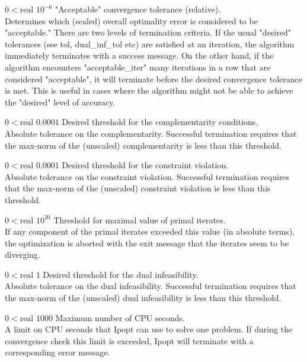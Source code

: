 %
{$0<\textrm{real}$}%
{$10^{- 6}$}%
{"Acceptable" convergence tolerance (relative).\\
Determines which (scaled) overall optimality error is considered to be "acceptable." There are two levels of termination criteria.  If the usual "desired" tolerances (see tol, dual\_inf\_tol etc) are satisfied at an iteration, the algorithm immediately terminates with a success message.  On the other hand, if the algorithm encounters "acceptable\_iter" many iterations in a row that are considered "acceptable", it will terminate before the desired convergence tolerance is met. This is useful in cases where the algorithm might not be able to achieve the "desired" level of accuracy.}%
{}

%
{$0<\textrm{real}$}%
{$0.0001$}%
{Desired threshold for the complementarity conditions.\\
Absolute tolerance on the complementarity. Successful termination requires that the max-norm of the (unscaled) complementarity is less than this threshold.}%
{}

%
{$0<\textrm{real}$}%
{$0.0001$}%
{Desired threshold for the constraint violation.\\
Absolute tolerance on the constraint violation. Successful termination requires that the max-norm of the (unscaled) constraint violation is less than this threshold.}%
{}

%
{$0<\textrm{real}$}%
{$10^{ 20}$}%
{Threshold for maximal value of primal iterates.\\
If any component of the primal iterates exceeded this value (in absolute terms), the optimization is aborted with the exit message that the iterates seem to be diverging.}%
{}

%
{$0<\textrm{real}$}%
{$1$}%
{Desired threshold for the dual infeasibility.\\
Absolute tolerance on the dual infeasibility. Successful termination requires that the max-norm of the (unscaled) dual infeasibility is less than this threshold.}%
{}

%
{$0<\textrm{real}$}%
{$1000$}%
{Maximum number of CPU seconds.\\
A limit on CPU seconds that Ipopt can use to solve one problem.  If during the convergence check this limit is exceeded, Ipopt will terminate with a corresponding error message.}%
{}

